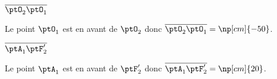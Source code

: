 


\begin{enonce}
$\overline{\ptO_2\ptO_1}$
\end{enonce}


\begin{corrige}
Le point $\ptO_1$ est en avant de $\ptO_2$
donc $\overline{\ptO_2\ptO_1}=\np[cm]{-50}$.
\end{corrige}




\begin{enonce}
$\overline{\ptA_1\ptF'_2}$
\end{enonce}


\begin{corrige}
Le point $\ptA_1$ est en avant de $\ptF'_2$
donc $\overline{\ptA_1\ptF'_2}=\np[cm]{20}$.
\end{corrige}


\finEntrainement





\newpage



\hauteurLargeurCadreReponse		{8mm}{5cm}
\initialisationEntrainement


